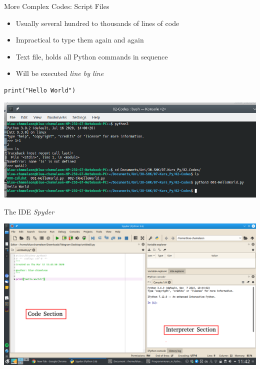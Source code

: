 \begin{frame}[fragile]{More Complex Codes: Script Files}
%
\vspace{-10pt}
%
\begin{minipage}[t]{.29\linewidth}
\vspace{0pt}
\begin{itemize}
\item Usually several hundred to thousands of lines of code
\item Impractical to type them again and again
\item[\Thus] Text file, holds all Python commands in sequence
\item Will be executed \emph{line by line}
\end{itemize}
\end{minipage}
%
\begin{minipage}[t]{.03\linewidth}
\phantom{lol}
\end{minipage}%
%
\begin{minipage}[t]{.65\linewidth}
\vspace{0pt}
\begin{codebox}
\begin{verbatim}
print("Hello World")
\end{verbatim}
\end{codebox}
\includegraphics[width=\linewidth]{./gfx/print-HelloWorld-Run}
\end{minipage}
%
\end{frame}


\begin{frame}[fragile]{The IDE \emph{Spyder}}
%
\begin{center}
\includegraphics[width=.8\linewidth]{./gfx/Spyder}
\end{center}
%
\end{frame}

